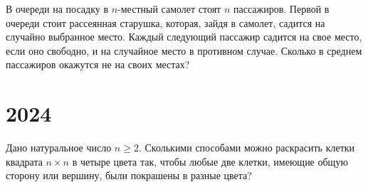 \documentclass[11pt, a4paper]{common/document_template}
\begin{document}
\begin{exercise}[2673]
В очереди на посадку в $n$-местный самолет стоят $n$ пассажиров. Первой в очереди стоит рассеянная старушка, которая, зайдя в самолет, садится на случайно выбранное место. Каждый следующий пассажир садится на свое место, если оно свободно, и на случайное место в противном случае. Сколько в среднем пассажиров окажутся не на своих местах?
\end{exercise}

\chapter{2024}

\begin{exercise}[2810]
Дано натуральное число $n \geqslant 2$. Сколькими способами можно раскрасить клетки квадрата $n \times n$ в четыре цвета так, чтобы любые две клетки, имеющие общую сторону или вершину, были покрашены в
разные цвета?
\end{exercise}
\end{document}
